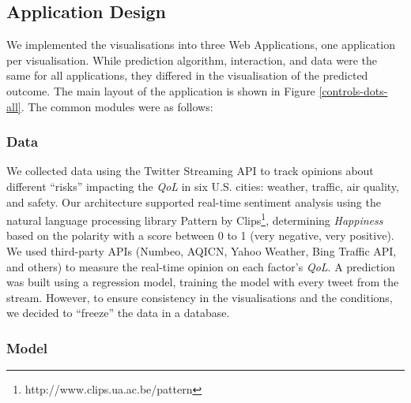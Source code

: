 \documentclass[final,5p,times,twocolumn,authoryear]{elsarticle}
\begin{document}
\subsection{Application Design} %
\label{sec:design}

We implemented the visualisations into three Web Applications, one application per visualisation. While prediction algorithm, interaction, and data were the same for all applications, they differed in the visualisation of the predicted outcome. The main layout of the application is shown in Figure \ref{controls-dots-all}. The common modules were as follows:

\subsubsection{Data} %
\label{sub:data}

We collected data using the Twitter Streaming API to track opinions about different ``risks'' impacting the \emph{QoL} in six U.S. cities: weather, traffic, air quality, and safety. Our architecture supported real-time sentiment analysis using the natural language processing library Pattern by Clips\footnote{http://www.clips.ua.ac.be/pattern}, determining \emph{Happiness} based on the polarity with a score between 0 to 1 (very negative, very positive). We used third-party APIs (Numbeo, AQICN, Yahoo Weather, Bing Traffic API, and others) to measure the real-time opinion on each factor's \emph{QoL}. A prediction was built using a  regression model, training the model with every tweet from the stream. However, to ensure consistency in the visualisations and the conditions, we decided to ``freeze'' the data in a database.


\subsubsection{Model} %
\label{sub:prediction}
\end{document}
